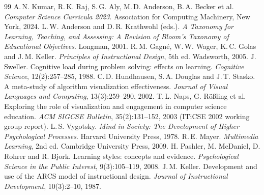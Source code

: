 \documentclass[11pt,a4paper]{article}
\begin{document}
\begin{thebibliography}{99}
 A.\,N. Kumar, R.\,K. Raj, S.\,G. Aly, M.\,D. Anderson, B.\,A. Becker et al.
  \emph{Computer Science Curricula 2023}. Association for Computing Machinery, New York, 2024.
 L.\,W. Anderson and D.\,R. Krathwohl (eds.). \emph{A Taxonomy for Learning,
  Teaching, and Assessing: A Revision of Bloom's Taxonomy of Educational Objectives}. Longman, 2001.
 R.\,M. Gagn\'e, W.\,W. Wager, K.\,C. Golas and J.\,M. Keller.
  \emph{Principles of Instructional Design}, 5th ed. Wadsworth, 2005.
 J. Sweller. Cognitive load during problem solving: effects on learning.
  \emph{Cognitive Science}, 12(2):257--285, 1988.
 C.\,D. Hundhausen, S.\,A. Douglas and J.\,T. Stasko. A meta-study of
  algorithm visualization effectiveness. \emph{Journal of Visual Languages and Computing},
  13(3):259--290, 2002.
 T.\,L. Naps, G. R\"o{\ss}ling et al. Exploring the role of visualization and
  engagement in computer science education. \emph{ACM SIGCSE Bulletin}, 35(2):131--152, 2003
  (ITiCSE 2002 working group report).
 L.\,S. Vygotsky. \emph{Mind in Society: The Development of Higher
  Psychological Processes}. Harvard University Press, 1978.
 R.\,E. Mayer. \emph{Multimedia Learning}, 2nd ed. Cambridge University Press, 2009.
 H. Pashler, M. McDaniel, D. Rohrer and R. Bjork. Learning styles: concepts
  and evidence. \emph{Psychological Science in the Public Interest}, 9(3):105--119, 2008.
 J.\,M. Keller. Development and use of the ARCS model of instructional design.
  \emph{Journal of Instructional Development}, 10(3):2--10, 1987.
\end{thebibliography}
\end{document}
